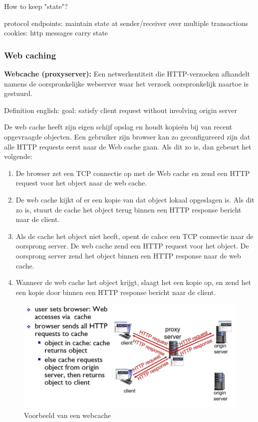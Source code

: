 \noindent How to keep "state"?

\bi
\itf protocol endpoints: maintain state at sender/receiver over multiple transactions
\itf cookies: http messages carry state
\ei



\subsubsection{Web caching}

\noindent \textbf{Webcache (proxyserver):} Een netwerkentiteit die HTTP-verzoeken afhandelt namens de oorspronkelijke webserver waar het verzoek oorspronkelijk naartoe is gestuurd.

\noindent Definition english: goal: satisfy client request without involving origin server

\noindent De web cache heeft zijn eigen schijf opslag en houdt kopieën bij van recent opgevraagde objecten. Een gebruiker zijn browser kan zo geconfigureerd zijn dat alle HTTP requests eerst naar de Web cache gaan. Als dit zo is, dan gebeurt het volgende:
\begin{enumerate}
    \item De browser zet een TCP connectie op met de Web cache en zend een HTTP request voor het object naar de web cache.
\item De web cache kijkt of er een kopie van dat object lokaal opgeslagen is. Als dit zo is, stuurt de cache het object terug binnen een HTTP response bericht naar de client.
\item Als de cache het object niet heeft, opent de cahce een TCP connectie naar de oorsprong server. De web cache zend een HTTP request voor het object. De oorsprong server zend het object binnen een HTTP response naar de web cache.
\item Wanneer de web cache het object krijgt, slaagt het een kopie op, en zend het een kopie door binnen een HTTP response bericht naar de client.
\end{enumerate}

\begin{figure}[h]
\centering
\includegraphics[width=4.5in]{./img/imghfdst2/webcache.jpg}
\caption{Voorbeeld van een webcache }
\label{fig:webcache}
\end{figure}

